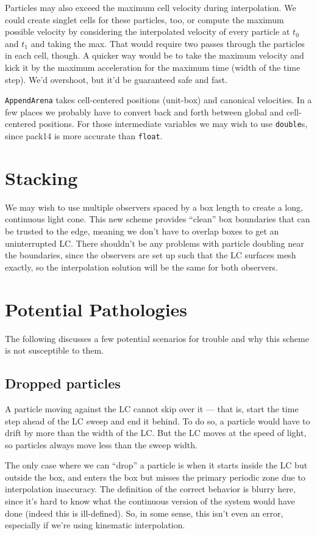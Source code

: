 \documentclass[a4paper]{article}
\begin{document}
Particles may also exceed the maximum cell velocity during interpolation.  We could create singlet cells for these particles, too, or compute the maximum possible velocity by considering the interpolated velocity of every particle at $t_0$ and $t_1$ and taking the max.  That would require two passes through the particles in each cell, though.  A quicker way would be to take the maximum velocity and kick it by the maximum acceleration for the maximum time (width of the time step).  We'd overshoot, but it'd be guaranteed safe and fast.

\texttt{AppendArena} takes cell-centered positions (unit-box) and canonical velocities.  In a few places we probably have to convert back and forth between global and cell-centered positions.  For those intermediate variables we may wish to use \texttt{double}s, since pack14 is more accurate than \texttt{float}.

\section{Stacking}
We may wish to use multiple observers spaced by a box length to create a long, continuous light cone.  This new scheme provides ``clean'' box boundaries that can be trusted to the edge, meaning we don't have to overlap boxes to get an uninterrupted LC.  There shouldn't be any problems with particle doubling near the boundaries, since the observers are set up such that the LC surfaces mesh exactly, so the interpolation solution will be the same for both observers.

\section{Potential Pathologies}
The following discusses a few potential scenarios for trouble and why this scheme is not susceptible to them.

\subsection{Dropped particles}\label{sec:drop}
A particle moving against the LC cannot skip over it --- that is, start the time step ahead of the LC sweep and end it behind.  To do so, a particle would have to drift by more than the width of the LC.  But the LC moves at the speed of light, so particles always move less than the sweep width.

The only case where we can ``drop'' a particle is when it starts inside the LC but outside the box, and enters the box but misses the primary periodic zone due to interpolation inaccuracy.  The definition of the correct behavior is blurry here, since it's hard to know what the continuous version of the system would have done (indeed this is ill-defined).  So, in some sense, this isn't even an error, especially if we're using kinematic interpolation.
\end{document}
